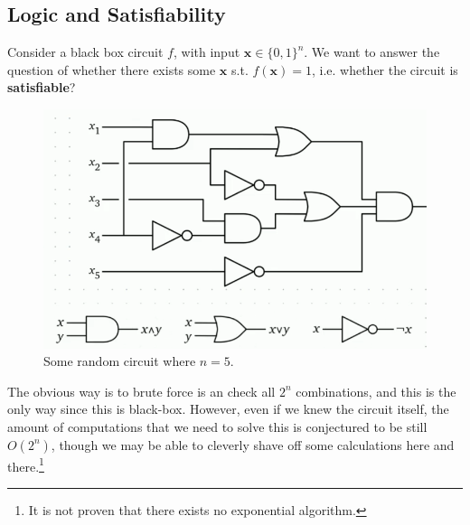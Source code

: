 \subsection{Logic and Satisfiability}

  \begin{definition}[CircuitSAT]
    Consider a black box circuit $f$, with input $\mathbf{x} \in \{0, 1\}^n$. We want to answer the question of whether there exists some $\mathbf{x}$ s.t. $f(\mathbf{x}) = 1$, i.e. whether the circuit is \textbf{satisfiable}? 

    \begin{figure}[H]
      \centering 
      \includegraphics[scale=0.4]{img/circuit.png}
      \caption{Some random circuit where $n = 5$.} 
      \label{fig:random_circuit}
    \end{figure}
    The obvious way is to brute force is an check all $2^n$ combinations, and this is the only way since this is black-box. However, even if we knew the circuit itself, the amount of computations that we need to solve this is conjectured to be still $O(2^n)$, though we may be able to cleverly shave off some calculations here and there.\footnote{It is not proven that there exists no exponential algorithm.}
  \end{definition}

